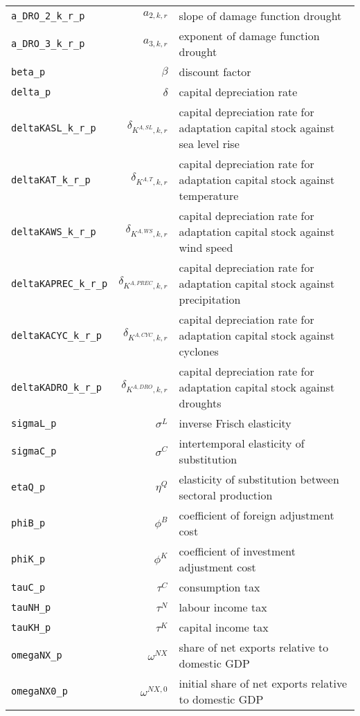 \begin{center}
\begin{longtable}{lrl}
\texttt{a\_DRO\_2\_k\_r\_p} & ${a_{2,k,r}}$ & slope of damage function drought\\
\texttt{a\_DRO\_3\_k\_r\_p} & ${a_{3,k,r}}$ & exponent of damage function drought\\
\texttt{beta\_p} & ${\beta}$ & discount factor\\
\texttt{delta\_p} & ${\delta}$ & capital depreciation rate\\
\texttt{deltaKASL\_k\_r\_p} & ${\delta_{K^{A,SL},k,r}}$ & capital depreciation rate for adaptation capital stock against sea level rise\\
\texttt{deltaKAT\_k\_r\_p} & ${\delta_{K^{A,T},k,r}}$ & capital depreciation rate for adaptation capital stock against temperature\\
\texttt{deltaKAWS\_k\_r\_p} & ${\delta_{K^{A,WS},k,r}}$ & capital depreciation rate for adaptation capital stock against wind speed\\
\texttt{deltaKAPREC\_k\_r\_p} & ${\delta_{K^{A,PREC},k,r}}$ & capital depreciation rate for adaptation capital stock against precipitation\\
\texttt{deltaKACYC\_k\_r\_p} & ${\delta_{K^{A,CYC},k,r}}$ & capital depreciation rate for adaptation capital stock against cyclones\\
\texttt{deltaKADRO\_k\_r\_p} & ${\delta_{K^{A,DRO},k,r}}$ & capital depreciation rate for adaptation capital stock against droughts\\
\texttt{sigmaL\_p} & ${\sigma^{L}}$ & inverse Frisch elasticity\\
\texttt{sigmaC\_p} & ${\sigma^{C}}$ & intertemporal elasticity of substitution\\
\texttt{etaQ\_p} & ${\eta^{Q}}$ & elasticity of substitution between sectoral production\\
\texttt{phiB\_p} & ${\phi^{B}}$ & coefficient of foreign adjustment cost\\
\texttt{phiK\_p} & ${\phi^{K}}$ & coefficient of investment adjustment cost\\
\texttt{tauC\_p} & ${\tau^{C}}$ & consumption tax\\
\texttt{tauNH\_p} & ${\tau^{N}}$ & labour income tax\\
\texttt{tauKH\_p} & ${\tau^{K}}$ & capital income tax\\
\texttt{omegaNX\_p} & ${\omega^{NX}}$ & share of net exports relative to domestic GDP\\
\texttt{omegaNX0\_p} & ${\omega^{NX,0}}$ & initial share of net exports relative to domestic GDP\\

\end{longtable}
\end{center}

